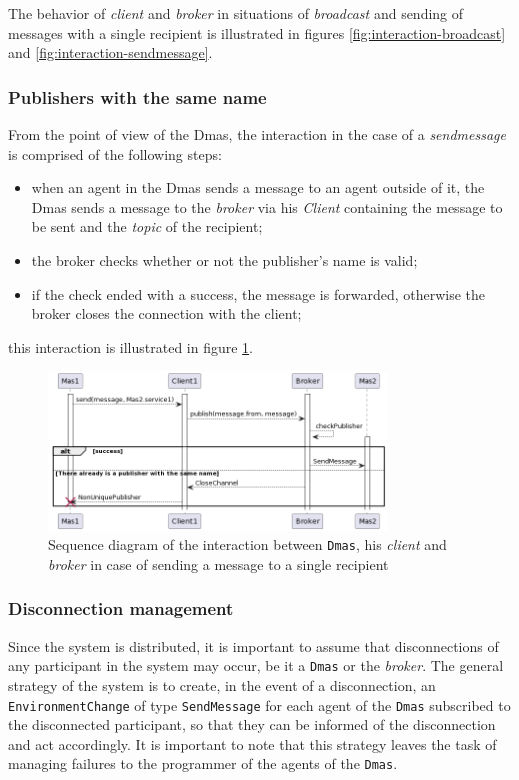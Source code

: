 The behavior of \textit{client} and \textit{broker} in situations of \textit{broadcast} and sending of messages with a single recipient is illustrated in figures \ref{fig:interaction-broadcast} and \ref{fig:interaction-sendmessage}.

\subsubsection{Publishers with the same name} \label{sec:publishers-same-name}

From the point of view of the Dmas, the interaction in the case of a \textit{sendmessage} is comprised of the following steps:
\begin{itemize}
    \item when an agent in the Dmas sends a message to an agent outside of it, the Dmas sends a message to the \textit{broker} via his \textit{Client} containing the message to be sent and the \textit{topic} of the recipient;
    \item the broker checks whether or not the publisher's name is valid;
    \item if the check ended with a success, the message is forwarded, otherwise the broker closes the connection with the client;
\end{itemize}

this interaction is illustrated in figure \ref{fig:interaction-sendmessage-pov}.

\begin{figure}[ht!]
    \centering
    \includegraphics[width=0.8\textwidth]{figures/interaction-sendmessage-pov.png}
    \caption{Sequence diagram of the interaction between \texttt{Dmas}, his \textit{client} and \textit{broker} in case of sending a message to a single recipient}
    \label{fig:interaction-sendmessage-pov}
\end{figure}


\subsubsection{Disconnection management}
Since the system is distributed, it is important to assume that disconnections of any participant in the system may occur, be it a \texttt{Dmas} or the \textit{broker}.
The general strategy of the system is to create, in the event of a disconnection, an \texttt{EnvironmentChange} of type \texttt{SendMessage} for each agent of the \texttt{Dmas} subscribed to the
disconnected participant, so that they can be informed of the disconnection and act accordingly. It is important to note that this strategy leaves the task of managing failures to the programmer of the agents of the \texttt{Dmas}.

